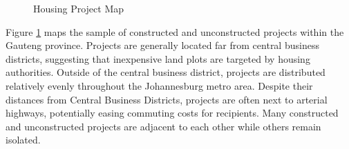 \documentclass[12pt]{article}
\begin{document}

\begin{figure}[t!]
\centering
\caption{Housing Project Map}\label{figure:map}
\end{figure}

Figure \ref{figure:map} maps the sample of constructed and unconstructed projects within the Gauteng province.  Projects are generally located far from central business districts, suggesting that inexpensive land plots are targeted by housing authorities.  Outside of the central business district, projects are distributed relatively evenly throughout the Johannesburg metro area.  Despite their distances from Central Business Districts, projects are often next to arterial highways, potentially easing commuting costs for recipients.  Many constructed and unconstructed projects are adjacent to each other while others remain isolated.  


\end{document}
